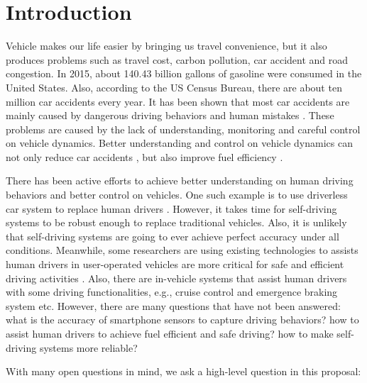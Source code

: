 
\chapter{Introduction} 


Vehicle makes our life easier by bringing us travel convenience, 
but it also produces problems such as travel cost, carbon pollution, 
car accident and road congestion.
In 2015, about 140.43 billion gallons of gasoline were consumed in the United States. 
Also, according to the US Census Bureau, there are about ten million car accidents every year.
It has been shown that most car accidents are mainly 
caused by dangerous driving behaviors and human mistakes \cite{progressive}. 
These problems are caused by the lack of understanding, monitoring 
and careful control on vehicle dynamics. 
Better understanding and control on vehicle dynamics
can not only reduce car accidents \cite{progressive}, 
but also improve fuel efficiency \cite{morganstanley2013}. 


There has been active efforts to achieve better understanding on
human driving behaviors and better control on vehicles. 
One such example is to use driverless car system to 
replace human drivers \cite{googledriverlesscar, kumar2012carspeak,
urmson2008autonomous,litman2013autonomous}. 
However, it takes time for self-driving systems to be robust enough to 
replace traditional vehicles. 
Also, it is unlikely that self-driving
systems are going to ever achieve perfect accuracy under all
conditions.
Meanwhile, some researchers are using existing technologies to assists human drivers
in user-operated vehicles are more critical for safe 
and efficient driving activities \cite{you2013carsafe, wang2013sensing, chen2015invisible, uber}. 
Also, there are in-vehicle systems that assist human drivers with some driving functionalities, 
e.g., cruise control \cite{bengtsson2001adaptive, cruise_control} and emergence braking system \cite{emergency_brake} etc. 
However, there are many questions that have not been answered: 
what is the accuracy of smartphone sensors to capture driving behaviors?
how to assist human drivers to achieve fuel efficient and safe driving?
how to make self-driving systems more reliable? 


With many open questions in mind, we ask a high-level question in this proposal: 

